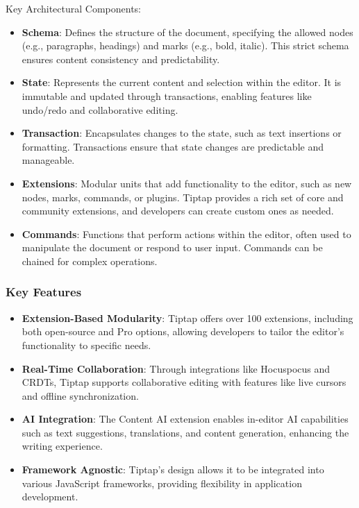 Key Architectural Components:
\begin{itemize}
    \item \textbf{Schema}: Defines the structure of the document, specifying the allowed nodes (e.g., paragraphs, headings) and marks (e.g., bold, italic). This strict schema ensures content consistency and predictability.
    \item \textbf{State}: Represents the current content and selection within the editor. It is immutable and updated through transactions, enabling features like undo/redo and collaborative editing.
    \item \textbf{Transaction}: Encapsulates changes to the state, such as text insertions or formatting. Transactions ensure that state changes are predictable and manageable.
    \item \textbf{Extensions}: Modular units that add functionality to the editor, such as new nodes, marks, commands, or plugins. Tiptap provides a rich set of core and community extensions, and developers can create custom ones as needed.
    \item \textbf{Commands}: Functions that perform actions within the editor, often used to manipulate the document or respond to user input. Commands can be chained for complex operations.
\end{itemize}

\subsubsection{Key Features}
\begin{itemize}
    \item \textbf{Extension-Based Modularity}: Tiptap offers over 100 extensions, including both open-source and Pro options, allowing developers to tailor the editor’s functionality to specific needs.
    \item \textbf{Real-Time Collaboration}: Through integrations like Hocuspocus and CRDTs, Tiptap supports collaborative editing with features like live cursors and offline synchronization.
    \item \textbf{AI Integration}: The Content AI extension enables in-editor AI capabilities such as text suggestions, translations, and content generation, enhancing the writing experience.
    \item \textbf{Framework Agnostic}: Tiptap’s design allows it to be integrated into various JavaScript frameworks, providing flexibility in application development.
\end{itemize}

